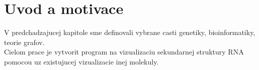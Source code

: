 
\chapter{Uvod a motivace}

V predchadzajucej kapitole sme definovali vybrane casti genetiky, bioinformatiky,
teorie grafov.
\\
Cielom prace je vytvorit program na vizualizaciu sekundarnej struktury RNA
pomocou uz existujucej vizualizacie inej molekuly.




